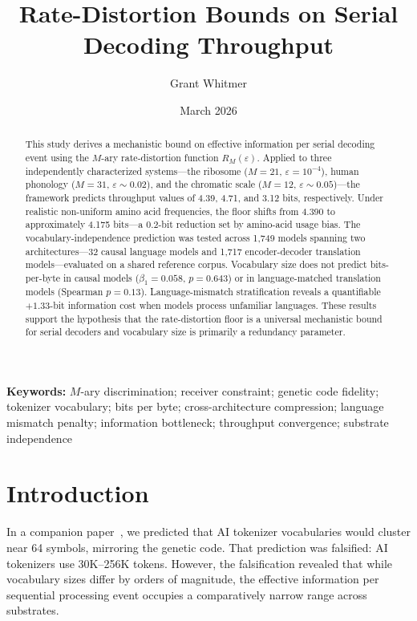 \documentclass[11pt]{article}
\title{Rate-Distortion Bounds on Serial Decoding Throughput}
\author{Grant Whitmer}
\date{March 2026}
\begin{document}
\maketitle

\begin{abstract}
This study derives a mechanistic bound on effective information per serial decoding event using the $M$-ary rate-distortion function $R_M(\varepsilon)$. Applied to three independently characterized systems---the ribosome ($M = 21$, $\varepsilon = 10^{-4}$), human phonology ($M = 31$, $\varepsilon \sim 0.02$), and the chromatic scale ($M = 12$, $\varepsilon \sim 0.05$)---the framework predicts throughput values of 4.39, 4.71, and 3.12 bits, respectively. Under realistic non-uniform amino acid frequencies, the floor shifts from 4.390 to approximately 4.175 bits---a 0.2-bit reduction set by amino-acid usage bias. The vocabulary-independence prediction was tested across 1,749 models spanning two architectures---32 causal language models and 1,717 encoder-decoder translation models---evaluated on a shared reference corpus. Vocabulary size does not predict bits-per-byte in causal models ($\beta_1 = 0.058$, $p = 0.643$) or in language-matched translation models (Spearman $p = 0.13$). Language-mismatch stratification reveals a quantifiable $+1.33$-bit information cost when models process unfamiliar languages. These results support the hypothesis that the rate-distortion floor is a universal mechanistic bound for serial decoders and vocabulary size is primarily a redundancy parameter.
\end{abstract}

\noindent\textbf{Keywords:} $M$-ary discrimination; receiver constraint; genetic code fidelity; tokenizer vocabulary; bits per byte; cross-architecture compression; language mismatch penalty; information bottleneck; throughput convergence; substrate independence

\section{Introduction}

In a companion paper~\cite{whitmer2026fons}, we predicted that AI tokenizer vocabularies would cluster near 64 symbols, mirroring the genetic code. That prediction was falsified: AI tokenizers use 30K--256K tokens. However, the falsification revealed that while vocabulary sizes differ by orders of magnitude, the effective information per sequential processing event occupies a comparatively narrow range across substrates.
\end{document}
